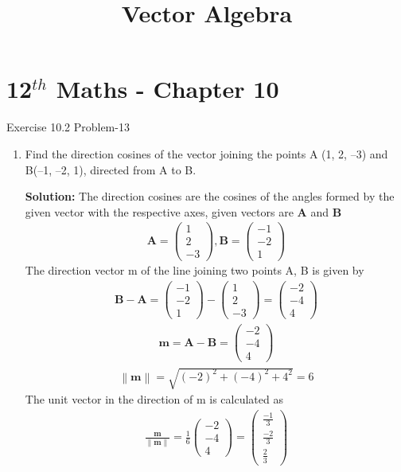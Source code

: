 \documentclass[12pt]{article}
\providecommand{\norm}[1]{\left\lVert#1\right\rVert}
\newcommand{\solution}{\noindent \textbf{Solution: }}
\newcommand{\myvec}[1]{\ensuremath{\begin{pmatrix}#1\end{pmatrix}}}
\let\vec\mathbf
\begin{document}
\begin{center}
\enlargethispage{-4cm}
\title{\textbf{Vector Algebra}}
\date{\vspace{-5ex}} %
\maketitle
\end{center}
\setcounter{page}{1}
\section*{12$^{th}$ Maths - Chapter 10}
 Exercise 10.2 Problem-13
\begin{enumerate}
\item Find the direction cosines of the vector joining the points A (1, 2, –3) and
B(–1, –2, 1), directed from A to B.

\solution The direction cosines are the cosines of the angles formed by the given vector with the respective axes, given vectors are $\vec{A}$ and $\vec{B}$
\begin{align}
	\vec{A} =\myvec{1\\2\\-3} , \vec{B}=\myvec{-1\\-2\\1}
\end{align}
The direction vector m of the line joining two points A, B is given by
\begin{align}
	\vec{B-A} = \myvec{-1\\-2\\1}-\myvec{1\\2\\-3}=\myvec{-2\\-4\\4}
\end{align}
\begin{align}
	\vec{m}=\vec{A-B}=\myvec{-2\\-4\\4}
\end{align}
\begin{align}
	\norm{\vec{m}}=\sqrt{(-2)^2+(-4)^2+4^2}=6
\end{align}
The unit vector in the direction of m is calculated as
\begin{align}
	\frac{\vec{m}}{\norm{\vec{m}}}=\frac{1}{6}{\myvec{-2\\-4\\4}}=\myvec{\frac{-1}{3}\\[4pt] \frac{-2}{3}\\[4pt] \frac{2}{3}}
\end{align}
\end{enumerate}
\end{document}
